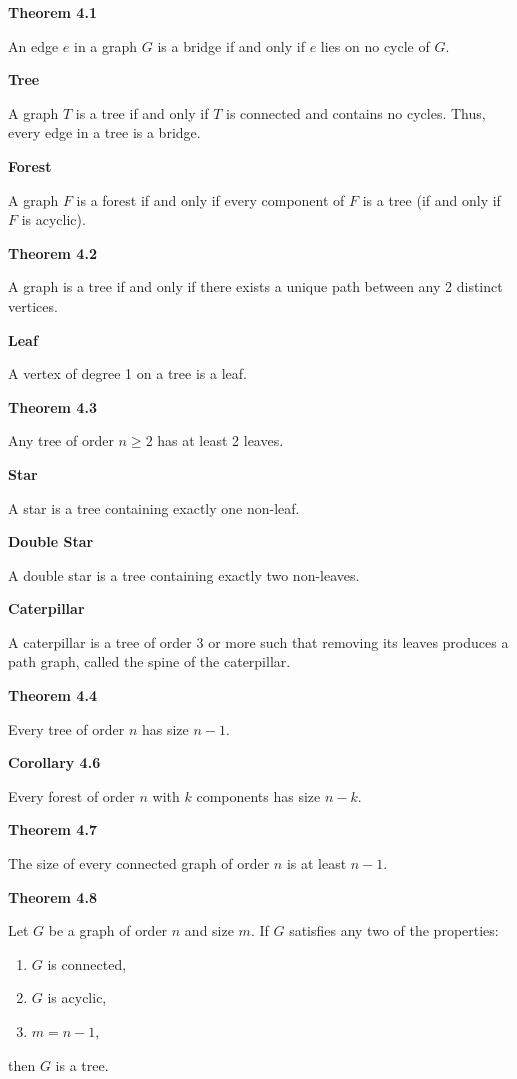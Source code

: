 \documentclass{article}
\begin{document}
\medskip\noindent\textbf{Theorem 4.1}

    An edge $e$ in a graph $G$ is a bridge if and only if $e$ lies on no cycle of $G$.

\medskip\noindent\textbf{Tree}

    A graph $T$ is a tree if and only if $T$ is connected and contains no cycles.
    Thus, every edge in a tree is a bridge.

\medskip\noindent\textbf{Forest}

    A graph $F$ is a forest if and only if every component of $F$ is a tree (if and only if $F$ is acyclic).

\medskip\noindent\textbf{Theorem 4.2}

    A graph is a tree if and only if there exists a unique path between any 2 distinct vertices.

\medskip\noindent\textbf{Leaf}

    A vertex of degree 1 on a tree is a leaf.

\medskip\noindent\textbf{Theorem 4.3}

    Any tree of order $n \geq 2$ has at least 2 leaves.

\medskip\noindent\textbf{Star}

    A star is a tree containing exactly one non-leaf.

\medskip\noindent\textbf{Double Star}

    A double star is a tree containing exactly two non-leaves.

\medskip\noindent\textbf{Caterpillar}

    A caterpillar is a tree of order 3 or more such that removing its leaves produces a path graph, called the spine of the caterpillar.

\medskip\noindent\textbf{Theorem 4.4}

    Every tree of order $n$ has size $n-1$.

\medskip\noindent\textbf{Corollary 4.6}

    Every forest of order $n$ with $k$ components has size $n-k$.

\medskip\noindent\textbf{Theorem 4.7}

    The size of every connected graph of order $n$ is at least $n-1$.

\medskip\noindent\textbf{Theorem 4.8}

    Let $G$ be a graph of order $n$ and size $m$. If $G$ satisfies any two of the properties:
    \begin{enumerate}
        \item $G$ is connected,
        \item $G$ is acyclic,
        \item $m = n - 1$,
    \end{enumerate}
    then $G$ is a tree.
\end{document}
